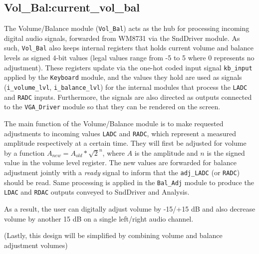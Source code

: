 \subsection{Vol\_Bal:current\_vol\_bal}

The Volume/Balance module (\verb=Vol_Bal=) acts as the hub for processing incoming digital audio signals, forwarded from WM8731 via the SndDriver module. As such, \verb=Vol_Bal= also keeps internal registers that holds current volume and balance levels as signed 4-bit values (legal values range from -5 to 5 where 0 represents no adjustment). These registers update via the one-hot coded input signal \verb=kb_input= applied by the \verb=Keyboard= module, and the values they hold are used as signals (\verb=i_volume_lvl=, \verb=i_balance_lvl=) for the internal modules that process the \verb=LADC= and \verb=RADC= inputs. Furthermore, the signals are also directed as outputs connected to the \verb=VGA_Driver= module so that they can be rendered on the screen.

The main function of the Volume/Balance module is to make requested adjustments to incoming values \verb=LADC= and \verb=RADC=, which represent a measured amplitude respectively at a certain time. They will first be adjusted for volume by a function $A_{new} = A_{old} * \sqrt{2}^n$, where $A$ is the amplitude and $n$ is the signed value in the volume level register. The new values are forwarded for balance adjustment jointly with a \emph{ready} signal to inform that the \verb=adj_LADC= (or \verb=RADC=) should be read. Same processing is applied in the \verb=Bal_Adj= module to produce the \verb=LDAC= and \verb=RDAC= outputs conveyed to SndDriver and Analysis.

As a result, the user can digitally adjust volume by -15/+15 dB and also decrease volume by another 15 dB on a single left/right audio channel.

(Lastly, this design will be simplified by combining volume and balance adjustment volumes)
%

